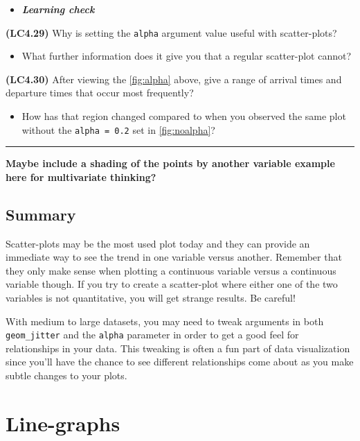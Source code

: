\documentclass[]{tufte-book}
\providecommand{\tightlist}{%
  \setlength{\itemsep}{0pt}\setlength{\parskip}{0pt}}
\newenvironment{rmdblock}[1]
  {\begin{shaded*}
  \begin{itemize}
  \renewcommand{\labelitemi}{
    \raisebox{-.7\height}[0pt][0pt]{
    }
  }
  \item
  }
  {
  \end{itemize}
  \end{shaded*}
  }
\newenvironment{learncheck}
  {\begin{rmdblock}{warning}}
  {\end{rmdblock}}
\begin{document}
\begin{learncheck}
\textbf{\emph{Learning check}}
\end{learncheck}

\textbf{(LC4.29)} Why is setting the \texttt{alpha} argument value
useful with scatter-plots?

\begin{itemize}
\tightlist
\item
  What further information does it give you that a regular scatter-plot
  cannot?
\end{itemize}

\textbf{(LC4.30)} After viewing the \ref{fig:alpha} above, give a range
of arrival times and departure times that occur most frequently?

\begin{itemize}
\tightlist
\item
  How has that region changed compared to when you observed the same
  plot without the \texttt{alpha\ =\ 0.2} set in \ref{fig:noalpha}?
\end{itemize}

\begin{center}\rule{0.5\linewidth}{\linethickness}\end{center}

\textbf{Maybe include a shading of the points by another variable
example here for multivariate thinking?}

\subsection{Summary}\label{summary-3}

Scatter-plots may be the most used plot today and they can provide an
immediate way to see the trend in one variable versus another. Remember
that they only make sense when plotting a continuous variable versus a
continuous variable though. If you try to create a scatter-plot where
either one of the two variables is not quantitative, you will get
strange results. Be careful!

With medium to large datasets, you may need to tweak arguments in both
\texttt{geom\_jitter} and the \texttt{alpha} parameter in order to get a
good feel for relationships in your data. This tweaking is often a fun
part of data visualization since you'll have the chance to see different
relationships come about as you make subtle changes to your plots.

\section{Line-graphs}\label{line-graphs}
\end{document}
